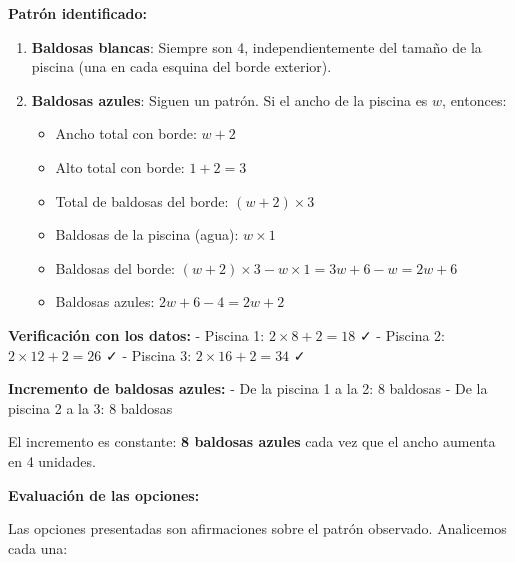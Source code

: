 \documentclass[
]{article}
\providecommand{\tightlist}{%
  \setlength{\itemsep}{0pt}\setlength{\parskip}{0pt}}
\begin{document}
\textbf{Patrón identificado:}

\begin{enumerate}
\def\labelenumi{\arabic{enumi}.}
\item
  \textbf{Baldosas blancas}: Siempre son 4, independientemente del
  tamaño de la piscina (una en cada esquina del borde exterior).
\item
  \textbf{Baldosas azules}: Siguen un patrón. Si el ancho de la piscina
  es \(w\), entonces:

  \begin{itemize}
  \tightlist
  \item
    Ancho total con borde: \(w + 2\)
  \item
    Alto total con borde: \(1 + 2 = 3\)
  \item
    Total de baldosas del borde: \((w + 2) \times 3\)
  \item
    Baldosas de la piscina (agua): \(w \times 1\)
  \item
    Baldosas del borde:
    \((w + 2) \times 3 - w \times 1 = 3w + 6 - w = 2w + 6\)
  \item
    Baldosas azules: \(2w + 6 - 4 = 2w + 2\)
  \end{itemize}
\end{enumerate}

\textbf{Verificación con los datos:} - Piscina 1:
\(2 \times 8 + 2 = 18\) ✓ - Piscina 2: \(2 \times 12 + 2 = 26\) ✓ -
Piscina 3: \(2 \times 16 + 2 = 34\) ✓

\textbf{Incremento de baldosas azules:} - De la piscina 1 a la 2: 8
baldosas - De la piscina 2 a la 3: 8 baldosas

El incremento es constante: \textbf{8 baldosas azules} cada vez que el
ancho aumenta en 4 unidades.

\textbf{Evaluación de las opciones:}

Las opciones presentadas son afirmaciones sobre el patrón observado.
Analicemos cada una:
\end{document}
